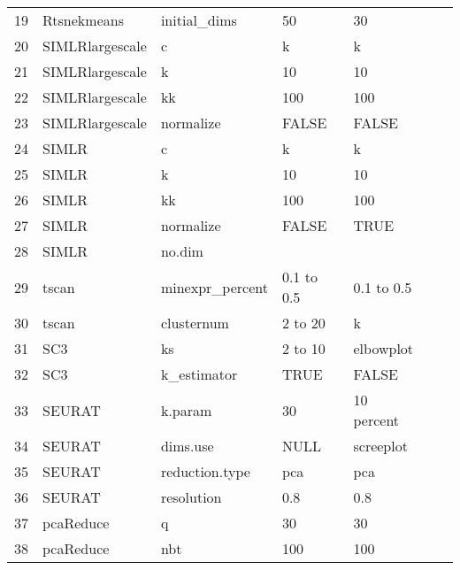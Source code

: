 \documentclass[11pt, a4paper]{article}\usepackage[]{graphicx}\usepackage[]{color}
\begin{document}
\begin{table}[ht]
\begin{tabular}{rllllll}
  19 & Rtsnekmeans & initial\_dims & 50 & 30 &  &  \\ 
  20 & SIMLRlargescale & c & k & k &  &  \\ 
  21 & SIMLRlargescale & k & 10 & 10 &  &  \\ 
  22 & SIMLRlargescale & kk & 100 & 100 &  &  \\ 
  23 & SIMLRlargescale & normalize & FALSE & FALSE &  &  \\ 
  24 & SIMLR & c & k & k &  &  \\ 
  25 & SIMLR & k & 10 & 10 &  &  \\ 
  26 & SIMLR & kk & 100 & 100 &  &  \\ 
  27 & SIMLR & normalize & FALSE & TRUE &  &  \\ 
  28 & SIMLR & no.dim &  &  &  &  \\ 
  29 & tscan & minexpr\_percent & 0.1 to 0.5 & 0.1 to 0.5 &  &  \\ 
  30 & tscan & clusternum & 2 to 20 & k &  &  \\ 
  31 & SC3 & ks & 2 to 10 & elbowplot &  &  \\ 
  32 & SC3 & k\_estimator & TRUE & FALSE &  &  \\ 
  33 & SEURAT & k.param & 30 & 10 percent &  &  \\ 
  34 & SEURAT & dims.use & NULL & screeplot &  &  \\ 
  35 & SEURAT & reduction.type & pca & pca &  &  \\ 
  36 & SEURAT & resolution & 0.8 & 0.8 &  &  \\ 
  37 & pcaReduce & q & 30 & 30 &  &  \\ 
  38 & pcaReduce & nbt & 100 & 100 &  &  \\ 
   \hline
\end{tabular}
\end{table}

\clearpage


\end{document}
